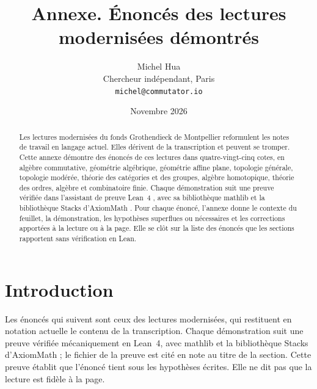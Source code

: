 \documentclass[11pt]{article}
\title{\Large Annexe. Énoncés des lectures modernisées démontrés}
\author{Michel Hua\\ \small Chercheur indépendant, Paris\\ \small \texttt{michel@commutator.io}}
\date{\small Novembre 2026}
\theoremstyle{plain}
\theoremstyle{definition}
\theoremstyle{plain}
\theoremstyle{definition}
\theoremstyle{remark}
\renewcommand{\_}{\bkunderscore\allowbreak}
\begin{document}
\maketitle

\begin{abstract}
\noindent Les lectures modernisées du fonds Grothendieck de Montpellier reformulent les notes de travail en langage actuel. Elles dérivent de la transcription et peuvent se tromper. Cette annexe démontre des énoncés de ces lectures dans quatre-vingt-cinq cotes, en algèbre commutative, géométrie algébrique, géométrie affine plane, topologie générale, topologie modérée, théorie des catégories et des groupes, algèbre homotopique, théorie des ordres, algèbre et combinatoire finie. Chaque démonstration suit une preuve vérifiée dans l'assistant de preuve Lean~4 \cite{lean4}, avec sa bibliothèque mathlib \cite{mathlib2020} et la bibliothèque Stacks d'AxiomMath \cite{axiomstacks}. Pour chaque énoncé, l'annexe donne le contexte du feuillet, la démonstration, les hypothèses superflues ou nécessaires et les corrections apportées à la lecture ou à la page. Elle se clôt sur la liste des énoncés que les sections rapportent sans vérification en Lean.
\end{abstract}

\tableofcontents

\section*{Introduction}

Les énoncés qui suivent sont ceux des lectures modernisées, qui restituent en notation actuelle le contenu de la transcription. Chaque démonstration suit une preuve vérifiée mécaniquement en Lean~4, avec mathlib et la bibliothèque Stacks d'AxiomMath \cite{axiomstacks} ; le fichier de la preuve est cité en note au titre de la section. Cette preuve établit que l'énoncé tient sous les hypothèses écrites. Elle ne dit pas que la lecture est fidèle à la page.
\end{document}
